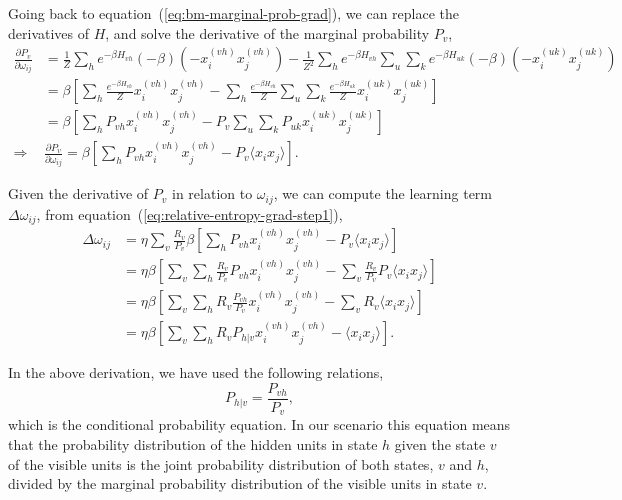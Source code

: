Going back to equation~(\ref{eq:bm-marginal-prob-grad}), we can replace the derivatives of $H$, and solve the derivative of the marginal probability $P_{v}$,
\begin{equation}
  \label{eq:bm-marginal-prob-grad-final}
  \begin{split}
    \frac{\partial P_{v}}{\partial \omega_{ij}} & = \frac{1}{Z} \sum_{h} e^{-\beta H_{vh}} (-\beta) (-x^{(vh)}_{i} x^{(vh)}_{j}) - \frac{1}{Z^{2}} \sum_{h} e^{-\beta H_{vh}} \sum_{u} \sum_{k} e^{-\beta H_{uk}} (-\beta) (-x^{(uk)}_{i} x^{(uk)}_{j}) \\
    & = \beta \left[ \sum_{h} \frac{e^{-\beta H_{vh}}}{Z} x^{(vh)}_{i} x^{(vh)}_{j} - \sum_{h} \frac{e^{-\beta H_{vh}}}{Z} \sum_{u} \sum_{k} \frac{e^{-\beta H_{uk}}}{Z} x^{(uk)}_{i} x^{(uk)}_{j}  \right] \\
    & = \beta \left[ \sum_{h} P_{vh} x^{(vh)}_{i} x^{(vh)}_{j} - P_{v} \sum_{u} \sum_{k} P_{uk} x^{(uk)}_{i} x^{(uk)}_{j} \right] \\
    \Rightarrow & \frac{\partial P_{v}}{\partial \omega_{ij}} = \beta \left[ \sum_{h} P_{vh} x^{(vh)}_{i} x^{(vh)}_{j} - P_{v} \langle x_{i} x_{j} \rangle  \right].
  \end{split}
\end{equation}

Given the derivative of $P_{v}$ in relation to $\omega_{ij}$, we can compute the learning term $\Delta \omega_{ij}$, from equation~(\ref{eq:relative-entropy-grad-step1}),
\begin{equation}
  \label{eq:delta-omega-final}
  \begin{split}
    \Delta \omega_{ij} & = \eta \sum_{v} \frac{R_{v}}{P_{v}} \beta \left[ \sum_{h} P_{vh} x^{(vh)}_{i} x^{(vh)}_{j} - P_{v} \langle x_{i} x_{j} \rangle \right]  \\
    & = \eta \beta \left[ \sum_{v} \sum_{h} \frac{R_{v}}{P_{v}} P_{vh} x^{(vh)}_{i} x^{(vh)}_{j} - \sum_{v} \frac{R_{v}}{P_{v}} P_{v} \langle x_{i} x_{j} \rangle \right] \\
    & = \eta \beta \left[ \sum_{v} \sum_{h} R_{v} \frac{P_{vh}}{P_{v}} x^{(vh)}_{i} x^{(vh)}_{j} - \sum_{v} R_{v} \langle x_{i} x_{j} \rangle \right] \\
    & = \eta \beta \left[ \sum_{v} \sum_{h} R_{v} P_{h|v} x^{(vh)}_{i} x^{(vh)}_{j} - \langle x_{i} x_{j} \rangle \right].
  \end{split}
\end{equation}

In the above derivation, we have used the following relations,
\begin{equation}
  P_{h|v} = \frac{P_{vh}}{P_{v}},
  \label{eq:conditional_prob1}
\end{equation}
which is the conditional probability equation.
In our scenario this equation means that the probability distribution of the hidden units in state $h$ given the state $v$ of the visible units is the joint probability distribution of both states, $v$ and $h$, divided by the marginal probability distribution of the visible units in state $v$.

